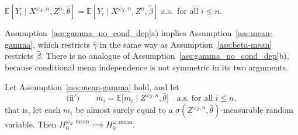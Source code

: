 \documentclass[twoside,11pt]{article}
\begin{document}
\begin{assumption}\label{ass:mean-gamma}
$\mathbb E[Y_i\mid X^{\omega_X,n},Z^n,\hat\theta]
=\mathbb E[Y_i\mid X^{\omega_X,n},Z^n,\hat\beta]$ a.s.\ for all $i\le n$.
\end{assumption}

Assumption~\ref{ass:gamma_no_cond_dep}a) implies Assumption~\ref{ass:mean-gamma}, which restricts $\hat\gamma$ in the same way as Assumption~\ref{ass:beta-mean} restricts $\hat\beta$. There is no analogue of Assumption~\ref{ass:gamma_no_cond_dep}b), because conditional mean independence is not symmetric in its two arguments.

\begin{theoremE}\label{thm:mean-transfer}
Let Assumption~\ref{ass:mean-gamma} hold, and let
\[
  \text{(ii$'$)}\qquad
  m_i=\mathbb E\big[m_i\mid Z^{\omega_Z,n},\hat\theta\big]
  \quad\text{a.s. for all } i\le n ,
\]
that is, let each $m_i$ be almost surely equal to a
$\sigma(Z^{\omega_Z,n},\hat\theta)$-measurable random variable. Then
$H_0^{\omega_X,\mathrm{mean}}\implies H_0^{\omega,\mathrm{mean}}$.
\end{theoremE}
\end{document}
